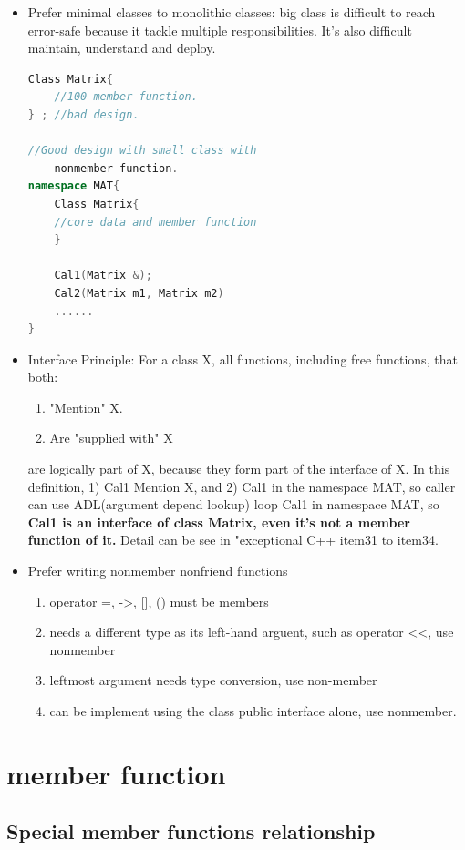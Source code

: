 \documentclass[a4paper,11pt,twoside]{book}
\begin{document}
\begin{itemize}
	\item Prefer minimal classes to monolithic classes: big class is difficult to reach error-safe because it tackle multiple responsibilities. It's also difficult maintain, understand and deploy.
\begin{lstlisting}[frame=single, language=c++]
Class Matrix{
	//100 member function.
} ; //bad design.
	
//Good design with small class with
	nonmember function.
namespace MAT{
	Class Matrix{
	//core data and member function
	}
	
	Cal1(Matrix &);
	Cal2(Matrix m1, Matrix m2)
	......
}
	\end{lstlisting}

	\item Interface Principle: For a class X, all functions, including free functions, that both:
	\begin{enumerate}
		\item "Mention" X.
		\item Are "supplied with" X
	\end{enumerate}
	are logically part of X, because they form part of the interface of X.  In this definition, 1) Cal1 Mention X,  and 2) Cal1 in the namespace MAT, so caller can use ADL(argument depend lookup) loop Cal1 in namespace MAT, so \textbf{Cal1 is an interface of class Matrix, even it's not a member function of it.} Detail can be see in "exceptional C++ item31 to item34.
	
	\item Prefer writing nonmember nonfriend functions
	\begin{enumerate}
		\item operator =, ->, [], () must be members
		\item needs a different type as its left-hand arguent, such as operator <<, use nonmember
		\item leftmost argument needs type conversion, use non-member
		\item can be implement using the class public interface alone, use nonmember.
	\end{enumerate}
	
\end{itemize}



\section{member function}

\subsection{Special member functions relationship}
\end{document}
